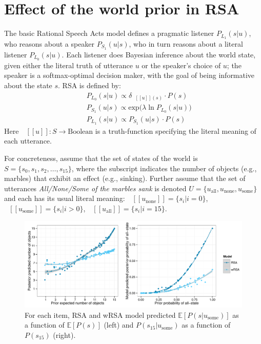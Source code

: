 \documentclass[10pt,letterpaper]{article}
\newcommand{\denote}[1]{\mbox{ $[\![ #1 ]\!]$}}
\begin{document}
\section{Effect of the world prior in RSA}

The basic Rational Speech Acts model defines a pragmatic listener $P_{L_1}(s|u)$, who reasons about a speaker $P_{S_1}(u|s)$, who in turn reasons about a literal listener $P_{L_0}(s|u)$. Each listener does Bayesian inference about the world state, given either the literal truth of utterance $u$ or the speaker's choice of $u$; the speaker is a softmax-optimal decision maker, with the goal of being informative about the state $s$.
RSA is defined by:
\begin{eqnarray}
&&P_{L_0}(s|u)\propto \delta_{\denote{u}(s)} \cdot P(s)\\
&&P_{S_1}(u|s) \propto \mathrm{exp}({\lambda \ln P_{L_0}(s|u))}\\ 
&&P_{L_1}(s|u)\propto P_{S_1}(u|s)\cdot P(s)
\end{eqnarray}
Here $\denote{u}: S \rightarrow \text{Boolean}$ is a truth-function specifying the literal meaning of each utterance.

For concreteness, assume that the set of states of the world is $S = \{s_0, s_1, s_2, \dots, s_{15}\}$, where the subscript indicates the number of objects (e.g., marbles) that exhibit an effect (e.g., sinking). 
Further assume that the set of utterances \emph{All/None/Some of the marbles sank} is denoted $U = \{u_{\textrm{all}}, u_{\textrm{none}}, u_{\textrm{some}}\}$ and each has its usual literal meaning: 
$\denote{u_{\textrm{none}}}= \{s_i | i = 0\}$,  
$\denote{u_{\textrm{some}}}= \{s_i | i > 0\}$,
$\denote{u_{\textrm{all}}}= \{s_i | i = 15\}$.


\begin{figure}
	\includegraphics[width=\textwidth]{pics/rsa-predictions}
	\caption{For each item, RSA and wRSA model predicted $\mathbb{E}[P(s|u_{\textrm{some}})]$ as a function of $\mathbb{E}[P(s)]$ (left) and $P(s_{15}|u_{\textrm{some}})$ as a function of $P(s_{15})$ (right).}
	\label{fig:rrsaexppredictions}	
\end{figure}
\end{document}
